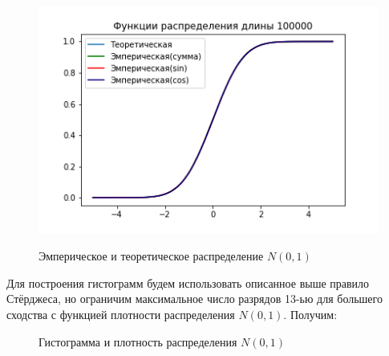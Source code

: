 \documentclass{article}
\begin{document}
\begin{figure}[h]
{		\includegraphics[scale=0.39]{./Task4/Task_4__distrib_100000.png}
	}
	\caption{Эмперическое и теоретическое распределение $N(0, 1)$}
	\label{fig:image}
\end{figure}

Для построения гистограмм будем использовать описанное выше правило Стёрджеса, но ограничим максимальное число разрядов 13-ью для большего сходства с функцией плотности распределения $N(0, 1)$. Получим:

\begin{figure}[H]
	\caption{Гистограмма и плотность распределения $N(0, 1)$}
	\label{fig:image}
\end{figure}
\end{document}
